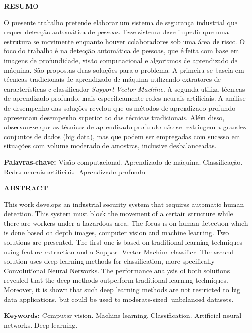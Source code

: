 \thispagestyle{plain}

\medskip

\begin{center}
  \textbf{RESUMO}
\end{center}



\bigskip




O presente trabalho pretende elaborar um sistema de segurança industrial que requer detecção automática de pessoas. Esse sistema deve impedir que uma estrutura se movimente enquanto houver colaboradores sob uma área de risco. O foco do trabalho é na detecção automática de pessoas, que é feita com base em imagens de profundidade, visão computacional e algoritmos de aprendizado de máquina. São propostas duas soluções para o problema. A primeira se baseia em técnicas tradicionais de aprendizado de máquina utilizando extratores de características e classificador \textit{Support Vector Machine}. A segunda utiliza técnicas de aprendizado profundo, mais especificamente redes neurais artificiais. A análise de desempenho das soluções revelou que os métodos de aprendizado profundo apresentam desempenho superior ao das técnicas tradicionais. Além disso, observou-se que as técnicas de aprendizado profundo não se restringem a grandes conjuntos de dados (big data), mas que podem ser empregadas com sucesso em situações com volume moderado de amostras, inclusive desbalanceadas.

\textbf{Palavras-chave:} Visão computacional. Aprendizado de máquina. Classificação. Redes neurais artificiais. Aprendizado profundo.

\cleardoublepageempty

\thispagestyle{plain}

\begin{center}
	\textbf{ABSTRACT}
\end{center}

\bigskip

This work develops an industrial security system that requires automatic human detection. This system must block the movement of a certain structure while there are workers under a hazardous area. The focus is on human detection which is done based on depth images, computer vision and machine learning. Two solutions are presented. The first one is based on traditional learning techniques using feature extraction and a Support Vector Machine classifier. The second solution uses deep learning methods for classification, more specifically Convolutional Neural Networks. The performance analysis of both solutions revealed that the deep methods outperform traditional learning techniques. Moreover, it is shown that such deep learning methods are not restricted to big data applications, but could be used to moderate-sized, unbalanced datasets.

\textbf{Keywords:} Computer vision. Machine learning. Classification. Artificial neural networks. Deep learning.
